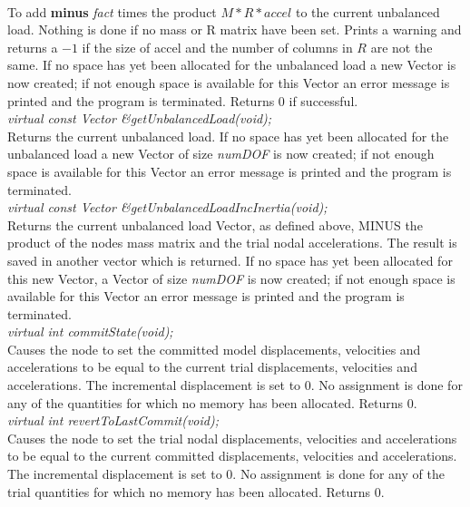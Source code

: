  \\ 
To add {\bf minus} {\em fact} times the product $M * R * accel$ to the
current unbalanced load. Nothing is done if no mass or R matrix have
been set. Prints a warning and returns a $-1$ if the size of accel and
the number of columns in $R$ are not the same. If no space has yet been
allocated for the unbalanced load a new Vector is now created;  
if not enough space is available for this Vector an error message is
printed and the program is terminated. Returns $0$ if successful.  \\ 

{\em virtual const Vector \&getUnbalancedLoad(void);} \\
Returns the current unbalanced load. If no space has yet been
allocated for the unbalanced load a new Vector of size {\em numDOF} is
now created; if not enough space is available for this Vector an error
message is printed and the program is terminated. \\ 

{\em virtual const Vector \&getUnbalancedLoadIncInertia(void);} \\
Returns the current unbalanced load Vector, as defined above, MINUS the product
of the nodes mass matrix and the trial nodal accelerations. The result
is saved in another vector which is returned. If no space has yet been
allocated for this new Vector, a Vector of size {\em numDOF} is now
created; if not enough space is available for this Vector an error
message is printed and the program is terminated. \\ 

{\em virtual int commitState(void);} \\
Causes the node to set the committed model displacements, velocities and
accelerations to be equal to the current trial displacements, velocities and
accelerations. The incremental displacement is set to $0$. No assignment is done 
for any of the quantities for
which no memory has been allocated. Returns $0$.\\

{\em virtual int revertToLastCommit(void);} \\
Causes the node to set the trial nodal displacements, velocities and
accelerations to be equal to the current committed displacements, velocities and
accelerations. The incremental displacement is set to $0$. No assignment is done 
for any of the trial quantities for which no memory has been allocated. Returns $0$.\\

